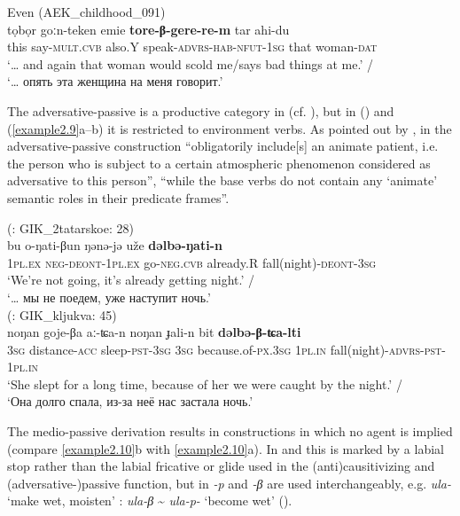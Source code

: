\documentclass[output=paper,colorlinks,citecolor=brown]{langscibook}
\begin{document}
\ex
     Even (AEK\_childhood\_091)\\
    \gll tọbọr	goːn-teken	emie	\textbf{tore-β-gere-re-m}	tar	ahi-du\\
    this	say-\textsc{mult.cvb}	also.Y	speak-\textsc{advrs-hab-nfut-1sg}	that	woman-\textsc{dat}\\
    \glt ‘… and again that woman would scold me/says bad things at me.’ /\\‘… опять эта женщина на меня говорит.’\\
    \z
\z

The adversative-passive is a productive category in  (cf. \citealt[21--26]{Malchukov1995}), but in  (\citealt[220--222]{Nedjalkov1997}) and  (\ref{example2.9}a--b) it is restricted to environment verbs. As pointed out by \citet[3]{Nedjalkov}, in  the ad\-ver\-sa\-tive-pas\-sive construction “obligatorily include[s] an animate patient, i.e. the person who is subject to a certain atmospheric phenomenon considered as adversative to this person”, “while the base verbs do not contain any `animate' semantic roles in their predicate frames”.

\ea
    \label{example2.9}
    \ea
     (\citealt{Pakendorf2017}: GIK\_2tatarskoe: 28)\\
    \gll bu	o-ŋati-βun	ŋənə-jə	uže	\textbf{dəlbə-ŋati-n}\\
    1\textsc{pl.ex}	\textsc{neg-deont-1pl.ex}	go-\textsc{neg.cvb}	already.R	fall(night)-\textsc{deont-3sg}\\
    \glt ‘We're not going, it's already getting night.’ /\\‘… мы не поедем, уже наступит ночь.’\\

\ex
     (\citealt{Pakendorf2017}: GIK\_kljukva: 45)\\
    \gll noŋan	goje-βa	aː-ʨa-n	noŋan	ɟali-n  bit	\textbf{dəlbə-β-ʨa-lti}\\
    3\textsc{sg}	distance-\textsc{acc}	sleep-\textsc{pst-3sg}	3\textsc{sg}	because.of-\textsc{px.3sg} 1\textsc{pl.in}	fall(night)-\textsc{advrs-pst-1pl.in}\\
    \glt ‘‎‎‎She slept for a long time, because of her we were caught by the night.’ /\\‘Она долго спала, из-за неё нас застала ночь.’\\
    \z
\z

The medio-passive derivation results in constructions in which no agent is implied (compare \ref{example2.10}b with \ref{example2.10}a). In  and  this is marked by a labial stop rather than the labial fricative or glide used in the (anti)causitivizing and (adversative-)passive function, but in  \textit{-p} and \textit{-β} are used interchangeably, e.g. \textit{ula-} ‘make wet, moisten’ : \textit{ula-β} {\textasciitilde} \textit{ula-p-} ‘become wet’ (\citealt[13]{Nedjalkov}).
\end{document}
